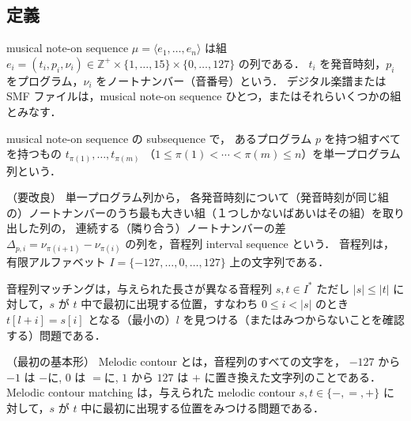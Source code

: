 \documentclass[11pt]{jreport}
\begin{document}
\subsection*{定義}
musical note-on sequence $\mathit{\mu} = \langle e_1, \ldots, e_n \rangle$ は組 $e_i = (t_i, p_i, \nu_i) \in \mathbb{Z}^+ \times \{1, \ldots, 15\} \times \{0, \ldots, 127\}$ の列である．
$t_i$ を発音時刻，$p_i$ をプログラム，$\nu_i$ をノートナンバー（音番号）という．
デジタル楽譜または SMF ファイルは，musical note-on sequence ひとつ，またはそれらいくつかの組とみなす．

musical note-on sequence の subsequence で，
あるプログラム $p$ を持つ組すべてを持つもの $t_{\pi(1)}, \ldots, t_{\pi(m)}$ （$1 \leq \pi(1) < \cdots< \pi(m) \leq n$）を単一プログラム列という．

（要改良）
単一プログラム列から，
各発音時刻について（発音時刻が同じ組の）ノートナンバーのうち最も大きい組（１つしかないばあいはその組）を取り出した列の，
連続する（隣り合う）ノートナンバーの差 $\Delta_{p,i} = \nu_{\pi(i+1)} - \nu_{\pi(i)}$ の列を，音程列 interval sequence という．
音程列は，有限アルファベット $I = \{-127, \ldots, 0, \ldots, 127\}$ 上の文字列である．

\begin{defn}
音程列マッチングは，与えられた長さが異なる音程列 $s, t \in I^*$ ただし $|s| \leq |t|$ に対して，$s$ が $t$ 中で最初に出現する位置，すなわち
$0 \leq i < |s|$ のとき $t[l+i] = s[i]$ となる（最小の）$l$ を見つける（またはみつからないことを確認する）問題である．

（最初の基本形）
Melodic contour とは，音程列のすべての文字を， $-127$ から $-1$ は $\mathtt{-}$に, $0$ は $\mathtt{=}$に, $1$ から $127$ は $\mathtt{+}$ に置き換えた文字列のことである．
Melodic contour matching は，与えられた melodic contour $s, t \in \{\mathtt{-}, \mathtt{=}, \mathtt{+}\}$ に対して，$s$ が $t$ 中に最初に出現する位置をみつける問題である．
\end{defn}
\end{document}

